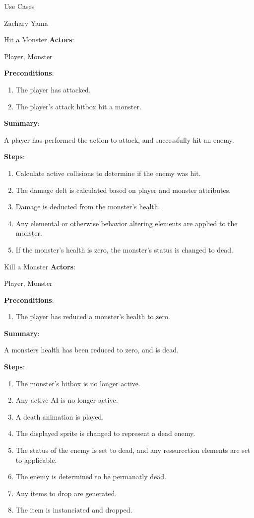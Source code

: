 \documentclass[12pt]{report}
\begin{document}
\begin{section}{Use Cases}
\begin{subsection}{Zachary Yama}
\begin{subsubsection}{Hit a Monster}
\textbf{Actors}:

Player, Monster

\textbf{Preconditions}:

\begin{enumerate}
\item The player has attacked.
\item The player's attack hitbox hit a monster.
\end{enumerate}

\textbf{Summary}:

A player has performed the action to attack, and successfully hit
an enemy.

\textbf{Steps}:

\begin{enumerate}
\item Calculate active collisions to determine if the enemy was hit.
\item The damage delt is calculated based on player and monster attributes.
\item Damage is deducted from the monster's health. 
\item Any elemental or otherwise behavior altering elements are applied to
the monster.
\item  If the monster's health is zero, the monster's status is changed to
dead.
\end{enumerate}
\end{subsubsection}

\begin{subsubsection}{Kill a Monster}
\textbf{Actors}:

Player, Monster

\textbf{Preconditions}:

\begin{enumerate}
\item The player has reduced a monster's health to zero.
\end{enumerate}

\textbf{Summary}:

A monsters health has been reduced to zero, and is dead.

\textbf{Steps}:

\begin{enumerate}
\item The monster's hitbox is no longer active.
\item Any active AI is no longer active.
\item A death animation is played.
\item The displayed sprite is changed to represent a dead enemy.
\item The status of the enemy is set to dead, and any ressurection elements
are set to applicable.
\item The enemy is determined to be permanatly dead.
\item Any items to drop are generated.
\item The item is instanciated and dropped.
\end{enumerate}
\end{subsubsection}


\end{subsection}
\end{section}
\end{document}
